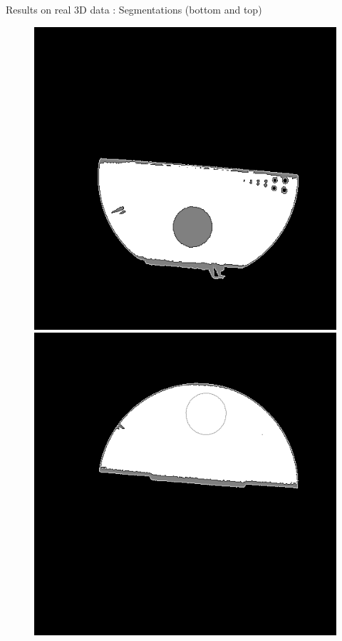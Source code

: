 \documentclass[latex]{beamer}
\begin{document}
\begin{frame}{}
\begin{block}{Results on real 3D data : Segmentations (bottom and top)}
\begin{figure}
\begin{minipage}[htb]{0.30\linewidth}
\end{minipage} \hfill
\begin{minipage}[htb]{0.30\linewidth}
\centering
\includegraphics[scale=0.19]{segmentationIQI_JMAPPottsIndGamma3K4Proj300Bas.png}
\end{minipage} \vfill
\begin{minipage}[htb]{0.30\linewidth}
\centering
\includegraphics[scale=0.19]{segmentation_FDKK4Proj300Haut.png}

\end{minipage}
\end{figure}
\end{block}
\end{frame}
\end{document}
